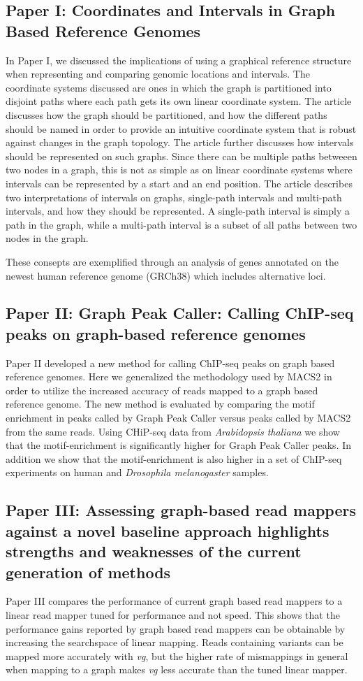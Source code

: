 \subsection*{Paper I: Coordinates and Intervals in Graph Based Reference Genomes}
In Paper I, we discussed the implications of using a graphical reference structure when representing and comparing genomic locations and intervals.
The coordinate systems discussed are ones in which the graph is partitioned into disjoint paths where each path gets its own linear coordinate system.
The article discusses how the graph should be partitioned, and how the different paths should be named in order to provide an intuitive coordinate system that is robust against changes in the graph topology. 
The article further discusses how intervals should be represented on such graphs.
Since there can be multiple paths betweeen two nodes in a graph, this is not as simple as on linear coordinate systems where intervals can be represented by a start and an end position.
The article describes two interpretations of intervals on graphs, single-path intervals and multi-path intervals, and how they should be represented.
A single-path interval is simply a path in the graph, while a multi-path interval is a subset of all paths between two nodes in the graph. 

These consepts are exemplified through an analysis of genes annotated on the newest human reference genome (GRCh38) which includes alternative loci.


\subsection*{Paper II: Graph Peak Caller: Calling ChIP-seq peaks on graph-based reference genomes}
Paper II developed a new method for calling ChIP-seq peaks on graph based reference genomes.
Here we generalized the methodology used by MACS2 in order to utilize the increased accuracy of reads mapped to a graph based reference genome.
The new method is evaluated by comparing the motif enrichment in peaks called by Graph Peak Caller versus peaks called by MACS2 from the same reads.
Using CHiP-seq data from \emph{Arabidopsis thaliana} we show that the motif-enrichment is significantly higher for Graph Peak Caller peaks.
In addition we show that the motif-enrichment is also higher in a set of ChIP-seq experiments on human and \emph{Drosophila melanogaster} samples.

\subsection*{Paper III: Assessing graph-based read mappers against a novel baseline approach highlights strengths and weaknesses of the current generation of methods}
Paper III compares the performance of current graph based read mappers to a linear read mapper tuned for performance and not speed.
This shows that the performance gains reported by graph based read mappers can be obtainable by increasing the searchspace of linear mapping.
Reads containing variants can be mapped more accurately with \emph{vg}, but the higher rate of mismappings in general when mapping to a graph makes \emph{vg} less accurate than the tuned linear mapper.

